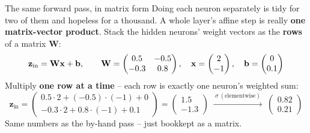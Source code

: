 \documentclass[aspectratio=169]{beamer}
\begin{document}
\begin{frame}{The same forward pass, in matrix form}
  Doing each neuron separately is tidy for two of them and hopeless for a thousand. A whole
  layer's affine step is really \textbf{one matrix-vector product}. Stack the hidden neurons'
  weight vectors as the \textbf{rows} of a matrix $\mathbf{W}$:
  \[
    \mathbf{z}_{\text{in}} = \mathbf{W}\mathbf{x} + \mathbf{b},\qquad
    \mathbf{W}=\begin{pmatrix} 0.5 & -0.5 \\ -0.3 & 0.8 \end{pmatrix},\quad
    \mathbf{x}=\begin{pmatrix} 2 \\ -1 \end{pmatrix},\quad
    \mathbf{b}=\begin{pmatrix} 0 \\ 0.1 \end{pmatrix}
  \]
  Multiply \textbf{one row at a time} -- each row is exactly one neuron's weighted sum:
  \[
    \mathbf{z}_{\text{in}}=\begin{pmatrix}
      0.5\cdot 2 + (-0.5)\cdot(-1) + 0 \\[2pt]
      -0.3\cdot 2 + 0.8\cdot(-1) + 0.1
    \end{pmatrix}
    =\begin{pmatrix} 1.5 \\ -1.3 \end{pmatrix}
    \;\xrightarrow{\ \sigma\ (\text{elementwise})\ }\;
    \begin{pmatrix} 0.82 \\ 0.21 \end{pmatrix}
  \]
  Same numbers as the by-hand pass -- just bookkept as a matrix.
  \vfill
\end{frame}
\end{document}
